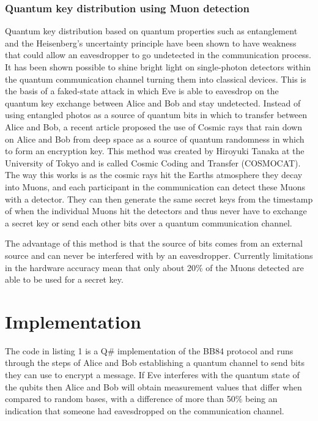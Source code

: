 \documentclass{article}
\begin{document}
\subsubsection{Quantum key distribution using Muon detection }
Quantum key distribution based on quantum properties such as entanglement and the Heisenberg's uncertainty principle have been shown to have weakness that could allow an eavesdropper to go undetected in the communication process. It has been shown possible to shine bright light on single-photon detectors within the quantum communication channel turning them into classical devices. This is the basis of a faked-state attack \cite{Guskind2009ControllingLight} in which Eve is able to eavesdrop on the quantum key exchange between Alice and Bob and stay undetected.
Instead of using entangled photos as a source of quantum bits in which to transfer between Alice and Bob, a recent article \cite{Cartlidge2023MuonsSystem} proposed the use of Cosmic rays that rain down on Alice and Bob from deep space as a source of quantum randomness in which to form an encryption key. This method was created by Hiroyuki Tanaka at the University of Tokyo and is called Cosmic Coding and Transfer (COSMOCAT). The way this works is as the cosmic rays hit the Earths atmosphere they decay into Muons, and each participant in the communication can detect these Muons with a detector. They can then generate the same secret keys from the timestamp of when the individual Muons hit the detectors and thus never have to exchange a secret key or send each other bits over a quantum communication channel. 

The advantage of this method is that the source of bits comes from an external source and can never be interfered with by an eavesdropper. Currently limitations in the hardware accuracy mean that only about 20\% of the Muons detected are able to be used for a secret key.


\section{Implementation}

The code \cite{Dale2023Leedale1981/msc-applied-crypto-coursework:Code.} in listing 1 is a Q\# implementation of the BB84 protocol and runs through the steps of Alice and Bob establishing a quantum channel to send bits they can use to encrypt a message. If Eve interferes with the quantum state of the qubits then Alice and Bob will obtain measurement values that differ when compared to random bases, with a difference of more than 50\% being an indication that someone had eavesdropped on the communication channel.
\end{document}
